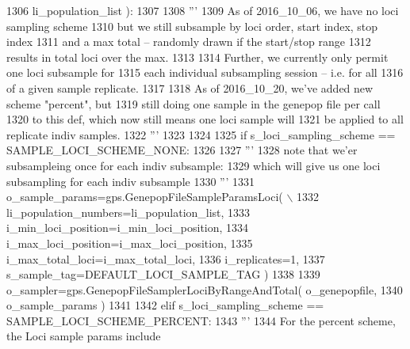 \begin{DoxyCode}
1306                         li\_population\_list ):
1307         
1308     \textcolor{stringliteral}{'''}
1309 \textcolor{stringliteral}{    As of 2016\_10\_06, we have no loci sampling scheme}
1310 \textcolor{stringliteral}{    but we still subsample by loci order, start index, stop index}
1311 \textcolor{stringliteral}{    and a max total -- randomly drawn if the start/stop range}
1312 \textcolor{stringliteral}{    results in total loci over the max. }
1313 \textcolor{stringliteral}{}
1314 \textcolor{stringliteral}{    Further, we currently only permit one loci subsample for}
1315 \textcolor{stringliteral}{    each individual subsampling session -- i.e. for all }
1316 \textcolor{stringliteral}{    of a given sample replicate.}
1317 \textcolor{stringliteral}{}
1318 \textcolor{stringliteral}{    As of 2016\_10\_20, we've added new scheme "percent", but}
1319 \textcolor{stringliteral}{    still doing one sample in the genepop file per call}
1320 \textcolor{stringliteral}{    to this def, which now still means one loci sample will}
1321 \textcolor{stringliteral}{    be applied to all replicate indiv samples.}
1322 \textcolor{stringliteral}{    '''}
1323 
1324 
1325     \textcolor{keywordflow}{if} s\_loci\_sampling\_scheme == SAMPLE\_LOCI\_SCHEME\_NONE:
1326 
1327         \textcolor{stringliteral}{'''}
1328 \textcolor{stringliteral}{        note that we'er subsampleing once for each indiv subsample:}
1329 \textcolor{stringliteral}{        which will give us one loci subsampling for each indiv subsample}
1330 \textcolor{stringliteral}{        '''}
1331         o\_sample\_params=gps.GenepopFileSampleParamsLoci( \(\backslash\)
1332                                     li\_population\_numbers=li\_population\_list,
1333                                     i\_min\_loci\_position=i\_min\_loci\_position,
1334                                     i\_max\_loci\_position=i\_max\_loci\_position,
1335                                     i\_max\_total\_loci=i\_max\_total\_loci,
1336                                     i\_replicates=1,
1337                                     s\_sample\_tag=DEFAULT\_LOCI\_SAMPLE\_TAG )
1338 
1339         o\_sampler=gps.GenepopFileSamplerLociByRangeAndTotal( o\_genepopfile,
1340                         o\_sample\_params )
1341                                                     
1342     \textcolor{keywordflow}{elif} s\_loci\_sampling\_scheme == SAMPLE\_LOCI\_SCHEME\_PERCENT:
1343         \textcolor{stringliteral}{'''}
1344 \textcolor{stringliteral}{        For the percent scheme, the Loci sample params include}

\end{DoxyCode}
